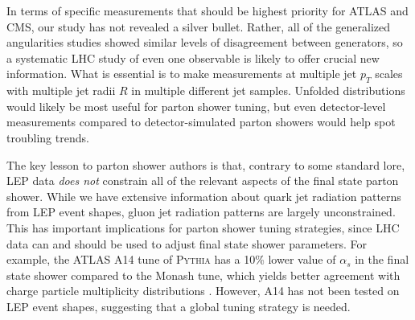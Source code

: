 \documentclass[11pt]{cernrep}
\begin{document}
In terms of specific measurements that should be highest priority for ATLAS and CMS, our study has not revealed a silver bullet.  Rather, all of the generalized angularities studies showed similar levels of disagreement between generators, so a systematic LHC study of even one observable is likely to offer crucial new information.  What is essential is to make measurements at multiple jet $p_T$ scales with multiple jet radii $R$ in multiple different jet samples.  Unfolded distributions would likely be most useful for parton shower tuning, but even detector-level measurements compared to detector-simulated parton showers would help spot troubling trends.

The key lesson to parton shower authors is that, contrary to some standard lore, LEP data \emph{does not} constrain all of the relevant aspects of the final state parton shower.  While we have extensive information about quark jet radiation patterns from LEP event shapes, gluon jet radiation patterns are largely unconstrained.  This has important implications for parton shower tuning strategies, since LHC data can and should be used to adjust final state shower parameters.  For example, the ATLAS A14 tune of \textsc{Pythia} has a 10\% lower value of $\alpha_s$ in the final state shower compared to the Monash tune, which yields better agreement with charge particle multiplicity distributions \cite{Aad:2016oit}.  However, A14 has not been tested on LEP event shapes, suggesting that a global tuning strategy is needed.
\end{document}
